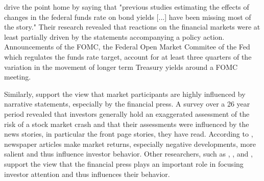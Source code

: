 \documentclass[11pt,a4paper,english,oneside]{book}
\numberwithin{equation}{chapter}
\begin{document}
\citet[~pp. 86--87]{Gurkaynak.2004} drive the point home by saying that "previous studies estimating the effects of changes in the federal funds rate on bond yields [...] have been missing most of the story." Their research revealed that reactions on the financial markets were at least partially driven by the statements accompanying a policy action. Announcements of the FOMC, the Federal Open Market Commitee of the Fed which regulates the funds rate target, account for at least three quarters of the variation in the movement of longer term Treasury yields around a FOMC meeting.

Similarly, \cite{Goetzmann.2016} support the view that market participants are highly influenced by narrative statements, especially by the financial press. A survey over a 26 year period revealed that investors generally hold an exaggerated assessment of the risk of a stock market crash and that their assessments were influenced by the news stories, in particular the front page stories, they have read. %
According to \cite{Goetzmann.2016}, newspaper articles make market returns, especially negative developments, more salient and thus influence investor behavior. Other researchers, such as \cite{Engelberg.2011}, \cite{Kraussl.2014}, and \cite{Yuan.2015}, support the view that the financial press plays an important role in focusing investor attention and thus influences their behavior.

\end{document}
